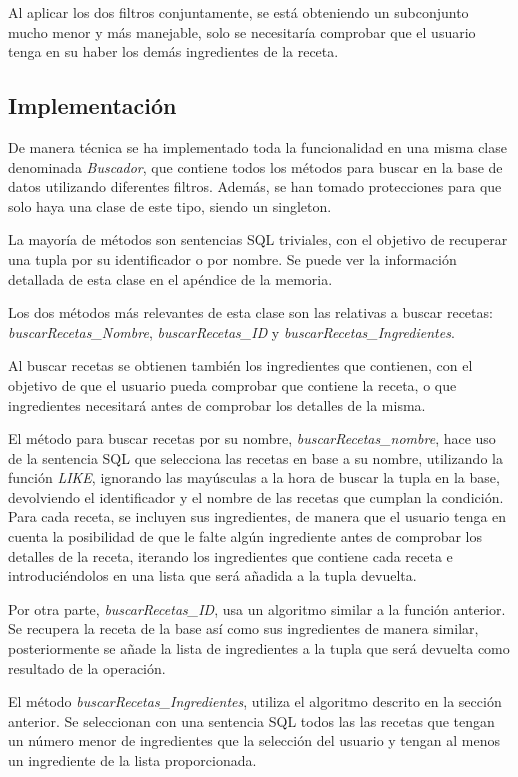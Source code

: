 Al aplicar los dos filtros conjuntamente, se está obteniendo un subconjunto mucho menor y más manejable, solo se necesitaría comprobar que el usuario tenga en su haber los demás ingredientes de la receta.

\subsection{Implementación}
De manera técnica se ha implementado toda la funcionalidad en una misma clase denominada \textit{Buscador}, que contiene todos los métodos para buscar en la base de datos utilizando diferentes filtros. Además, se han tomado protecciones para que solo haya una clase de este tipo, siendo un \gls{singleton}. 

La mayoría de métodos son sentencias \gls{SQL} triviales, con el objetivo de recuperar una \gls{tupla} por su identificador o por nombre. Se puede ver la información detallada de esta clase en el apéndice de la memoria.

Los dos métodos más relevantes de esta clase son las relativas a buscar recetas: \textit{buscarRecetas\_Nombre}, \textit{buscarRecetas\_ID} y \textit{buscarRecetas\_Ingredientes}.

Al buscar recetas se obtienen también los ingredientes que contienen, con el objetivo de que el usuario pueda comprobar que contiene la receta, o que ingredientes necesitará antes de comprobar los detalles de la misma.

El método para buscar recetas por su nombre, \textit{buscarRecetas\_nombre}, hace uso de la sentencia \gls{SQL} que selecciona las recetas en base a su nombre, utilizando la función \textit{LIKE},  ignorando las mayúsculas a la hora de buscar la \gls{tupla} en la \gls{base}, devolviendo el identificador y el nombre de las recetas que cumplan la condición.
Para cada receta, se incluyen sus ingredientes, de manera que el usuario tenga en cuenta la posibilidad de que le falte algún ingrediente antes de comprobar los detalles de la receta, iterando los ingredientes que contiene cada receta e introduciéndolos en una lista que será añadida a la \gls{tupla} devuelta.

Por otra parte, \textit{buscarRecetas\_ID}, usa un algoritmo similar a la función anterior. Se recupera la receta de la \gls{base} así como sus ingredientes de manera similar, posteriormente se añade la lista de ingredientes a la \gls{tupla} que será devuelta como resultado de la operación. 

El método \textit{buscarRecetas\_Ingredientes}, utiliza el algoritmo descrito en la sección anterior. Se seleccionan con una sentencia \gls{SQL} todos las las recetas que tengan un número menor de ingredientes que la selección del usuario y tengan al menos un ingrediente de la lista proporcionada. 

